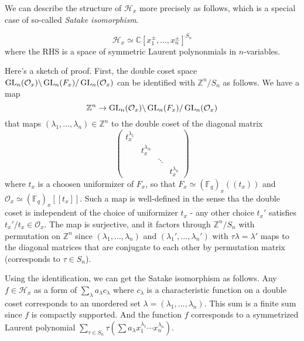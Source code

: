 We can describe the structure of $\mathcal{H}_x$ more precisely as follows, which is a special case of so-called \emph{Satake isomorphism}.

\begin{theorem}
    $$
    \mathcal{H}_x \simeq \mathbb{C}[x_1^{\pm}, \dots, x_n^{\pm}]^{S_n}
    $$
    where the RHS is a space of symmetric Laurent polynonmials in $n$-variables.
\end{theorem}
Here's a sketch of proof.
First, the double coset space $\operatorname{\mathrm{GL}}_n(\mathcal{O}_x) \backslash \operatorname{\mathrm{GL}}_n(F_x) / \operatorname{\mathrm{GL}}_n(\mathcal{O}_x)$ can be identified with $\mathbb{Z}^{n}/S_n$ as follows.
We have a map 
$$
\mathbb{Z}^{n} \to \operatorname{\mathrm{GL}}_n(\mathcal{O}_x) \backslash \operatorname{\mathrm{GL}}_n(F_x) / \operatorname{\mathrm{GL}}_n(\mathcal{O}_x)
$$
that maps $(\lambda_1, \dots, \lambda_n) \in \mathbb{Z}^{n}$ to the double coset of the diagonal matrix
$$
\begin{pmatrix}
    t_{x}^{\lambda_1} & & & \\
    & t_{x}^{\lambda_@} & & \\
    & & \ddots & \\
    & & & t_{x}^{\lambda_n}
\end{pmatrix}
$$
where $t_x$ is a choosen uniformizer of $F_x$, so that $F_x \simeq (\mathbb{F}_q)_x((t_x))$ 
and $\mathcal{O}_x \simeq (\mathbb{F}_{q})_x[[t_x]]$.
Such a map is well-defined in the sense tha the double coset is independent of the choice of uniformizer $t_x$ - any other choice $t_x'$ satisfies $t_x'/t_x \in \mathcal{O}_x$.
The map is surjective, and it factors through $\mathbb{Z}^{n}/S_n$ with permutation on $\mathbb{Z}^n$ since
$(\lambda_1, \dots, \lambda_n)$ and $(\lambda_1', \dots, \lambda_n')$ with $\tau\lambda = \lambda'$ maps to the diagonal matrices
that are conjugate to each other by permutation matrix (corresponds to $\tau\in S_n$).

Using the identification, we can get the Satake isomorphism as follows.
Any $f \in \mathcal{H}_{x}$ as a form of $\sum_{\lambda} a_{\lambda} c_{\lambda}$
where $c_{\lambda}$ is a characteristic function on a double coset corresponds to an unordered set $\lambda = (\lambda_1, \dots, \lambda_n)$.
This sum is a finite sum since $f$ is compactly supported.
And the function $f$ corresponds to a symmetrized Laurent polynomial
$\sum_{\tau\in S_n} \tau(\sum a_{\lambda}x_1^{\lambda_1}\cdots x_{n}^{\lambda_n})$.

